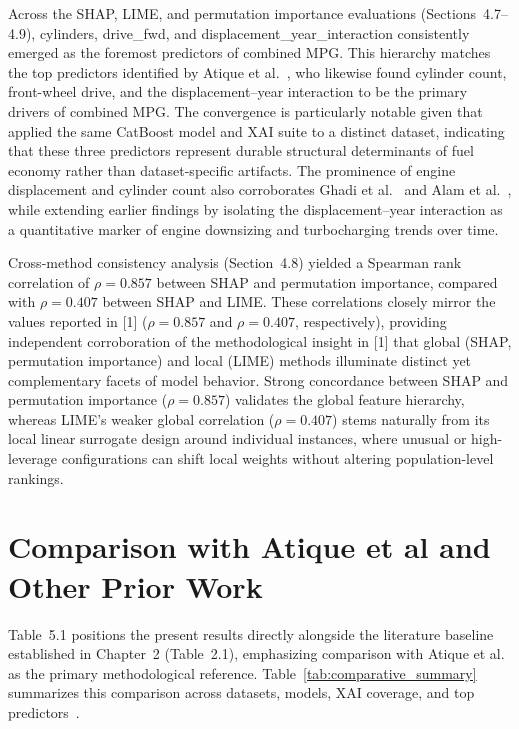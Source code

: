 Across the SHAP, LIME, and permutation importance evaluations (Sections~4.7--4.9), cylinders, drive\_fwd, and displacement\_year\_interaction consistently emerged as the foremost predictors of combined MPG. This hierarchy matches the top predictors identified by Atique et al.~\cite{atique2026explainable}, who likewise found cylinder count, front-wheel drive, and the displacement--year interaction to be the primary drivers of combined MPG. The convergence is particularly notable given that~\cite{atique2026explainable} applied the same CatBoost model and XAI suite to a distinct dataset, indicating that these three predictors represent durable structural determinants of fuel economy rather than dataset-specific artifacts. The prominence of engine displacement and cylinder count also corroborates Ghadi et al.~\cite{ghadi2025explainable} and Alam et al.~\cite{alam2025deep}, while extending earlier findings by isolating the displacement--year interaction as a quantitative marker of engine downsizing and turbocharging trends over time.

Cross-method consistency analysis (Section~4.8) yielded a Spearman rank correlation of \(\rho = 0.857\) between SHAP and permutation importance, compared with \(\rho = 0.407\) between SHAP and LIME. These correlations closely mirror the values reported in [1] (\(\rho = 0.857\) and \(\rho = 0.407\), respectively), providing independent corroboration of the methodological insight in [1] that global (SHAP, permutation importance) and local (LIME) methods illuminate distinct yet complementary facets of model behavior. Strong concordance between SHAP and permutation importance (\(\rho = 0.857\)) validates the global feature hierarchy, whereas LIME's weaker global correlation (\(\rho = 0.407\)) stems naturally from its local linear surrogate design around individual instances, where unusual or high-leverage configurations can shift local weights without altering population-level rankings.


\section{Comparison with Atique et al and Other Prior Work}

Table~5.1 positions the present results directly alongside the literature baseline established in Chapter~2 (Table~2.1), emphasizing comparison with Atique et al.~\cite{atique2026explainable} as the primary methodological reference. Table~\ref{tab:comparative_summary} summarizes this comparison across datasets, models, XAI coverage, and top predictors~\cite{atique2026explainable}.

